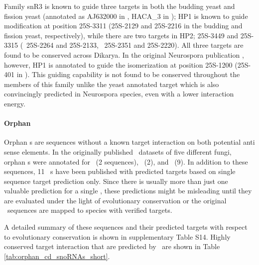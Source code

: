 Family snR3 is known \cite{Schattner:2004} to guide three targets in
both the budding yeast and fission yeast (annotated as AJ632000 in
\spo, HACA\_3 in \snostrip); HP1 is known to guide modification at
position 25S-3311 (25S-2129 and 25S-2216 in the budding and fission
yeast, respectively), while there are two targets in HP2; 25S-3449 and
25S-3315 (\sce\ 25S-2264 and 25S-2133, \spo\ 25S-2351 and
25S-2220). All three targets are found to be conserved across
Dikarya. In the original Neurospora publication \cite{Liu:2009},
however, HP1 is annotated to guide the isomerization at position
25S-1200 (25S-401 in \Ncr). This guiding capability is not found to be
conserved throughout the members of this family unlike the yeast
annotated target which is also convincingly predicted in Neurospora
species, even with a lower interaction energy.

\paragraph{\textbf{Orphan \sno}}
Orphan \sno s are sequences without a known target interaction on both
potential anti sense elements. In the originally published \sno\
datasets of five different fungi, orphan \cd s were annotated for
\sce\ (2 sequences), \ncr\ (2), and \afu\ (9). In addition to these
sequences, 11 \ncr\ \sno s have been published with predicted targets
based on single sequence target prediction only. Since there is
usually more than just one valuable prediction for a single \sno,
these predictions might be misleading until they are evaluated under
the light of evolutionary conservation or the original \sno\ sequences
are mapped to species with verified targets.

A detailed summary of these sequences and their predicted targets with
respect to evolutionary conservation is shown in supplementary Table
S14. Highly conserved target interaction that are predicted by
\snostrip\ are shown in Table \ref{tab:orphan_cd_snoRNAs_short}.

